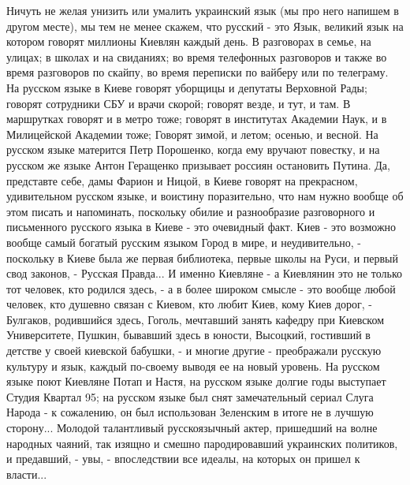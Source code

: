 Ничуть не желая унизить или умалить украинский язык (мы про
него напишем в другом месте), мы тем не менее скажем, что русский - это Язык,
великий язык на котором говорят миллионы Киевлян каждый день. В разговорах в
семье, на улицах; в школах и на свиданиях; во время телефонных разговоров и
также во время разговоров по скайпу, во время переписки по вайберу или по
телеграму. На русском языке в Киеве говорят уборщицы и депутаты Верховной Рады;
говорят сотрудники СБУ и врачи скорой; говорят везде, и тут, и там. В
маршрутках говорят и в метро тоже; говорят в институтах Академии Наук, и в
Милицейской Академии тоже; Говорят зимой, и летом; осенью, и весной. На русском
языке матерится Петр Порошенко, когда ему вручают повестку, и на русском же
языке Антон Геращенко призывает россиян остановить Путина. Да, представте себе,
дамы Фарион и Ницой, в Киеве говорят на прекрасном, удивительном русском языке,
и воистину поразительно, что нам нужно вообще об этом писать и напоминать,
поскольку обилие и разнообразие разговорного и письменного русского языка в
Киеве - это очевидный факт. Киев - это возможно вообще самый богатый русским
языком Город в мире, и неудивительно, - поскольку в Киеве была же первая библиотека, первые школы
на Руси, и первый свод законов, - Русская Правда... И именно Киевляне - а
Киевлянин это не только тот человек, кто родился здесь, - а в более широком
смысле - это вообще любой человек, кто душевно связан с Киевом, кто любит Киев,
кому Киев дорог, - Булгаков, родившийся здесь, Гоголь, мечтавший занять кафедру
при Киевском Университете, Пушкин, бывавший здесь в юности, Высоцкий, гостивший
в детстве у своей киевской бабушки, - и многие другие - преображали русскую
культуру и язык, каждый по-своему выводя ее на новый уровень.  На русском языке
поют Киевляне Потап и Настя, на русском языке долгие годы выступает Студия
Квартал 95; на русском языке был снят замечательный сериал Слуга Народа - к
сожалению, он был использован Зеленским в итоге не в лучшую сторону... Молодой
талантливый русскоязычный актер, пришедший на волне народных чаяний, так изящно
и смешно пародировавший украинских политиков, и предавший, - увы, -
впоследствии все идеалы, на которых он пришел к власти...    


